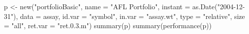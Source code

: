 \message{ !name(matching_portfolio.Rnw.tex)}{\makeatletter\gdef\AucTeX@cite#1[#2]#3{[#3#1#2]}\gdef\cite{\@ifnextchar[{\AucTeX@cite{, }}{\AucTeX@cite{}[]}}}

p <- new("portfolioBasic",
         name    = "AFL Portfolio",
         instant = as.Date("2004-12-31"),
         data    = assay,
         id.var  = "symbol",
         in.var  = "assay.wt",
         type    = "relative",
         size    = "all",
         ret.var = "ret.0.3.m")
summary(p)
summary(performance(p))

